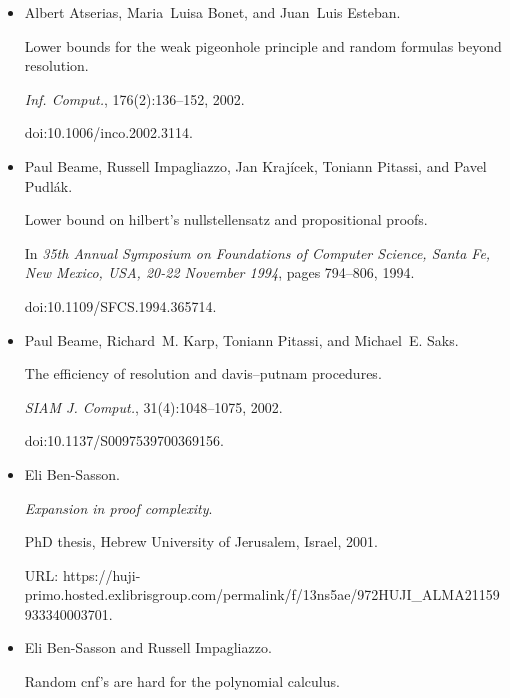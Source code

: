 \begin{itemize}
\item[] 
[9]

Albert Atserias, Maria Luisa Bonet, and Juan Luis Esteban.


Lower bounds for the weak pigeonhole principle and random formulas
beyond resolution.


\emph{Inf. Comput.}, 176(2):136–152, 2002.


doi:10.1006/inco.2002.3114.





\item[] 
[10]

Paul Beame, Russell Impagliazzo, Jan Krajícek, Toniann Pitassi, and
Pavel Pudlák.


Lower bound on hilbert’s nullstellensatz and propositional proofs.


In \emph{35th Annual Symposium on Foundations of Computer Science,
Santa Fe, New Mexico, USA, 20-22 November 1994}, pages 794–806, 1994.


doi:10.1109/SFCS.1994.365714.





\item[] 
[11]

Paul Beame, Richard M. Karp, Toniann Pitassi, and Michael E. Saks.


The efficiency of resolution and davis–putnam procedures.


\emph{SIAM J. Comput.}, 31(4):1048–1075, 2002.


doi:10.1137/S0097539700369156.





\item[] 
[12]

Eli Ben-Sasson.


\emph{Expansion in proof complexity}.


PhD thesis, Hebrew University of Jerusalem, Israel, 2001.


URL:
https://huji-primo.hosted.exlibrisgroup.com/permalink/f/13ns5ae/972HUJI\_ALMA21159933340003701.





\item[] 
[13]

Eli Ben-Sasson and Russell Impagliazzo.


Random cnf’s are hard for the polynomial calculus.



\end{itemize}

